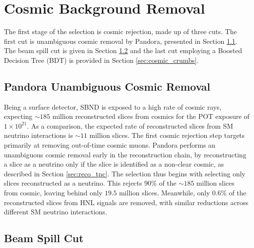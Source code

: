 


\section{Cosmic Background Removal}
\label{sec:cosmic_rej}

The first stage of the selection is cosmic rejection, made up of three cuts.
The first cut is unambiguous cosmic removal by Pandora, presented in Section \ref{sec:cosmic_pandora}.
The beam spill cut is given in Section \ref{sec:cosmic_spill} and the last cut employing a Boosted Decision Tree (BDT) is provided in Section \ref{sec:cosmic_crumbs}.

\subsection{Pandora Unambiguous Cosmic Removal}
\label{sec:cosmic_pandora}

Being a surface detector, SBND is exposed to a high rate of cosmic rays, expecting $\sim 185$ million reconstructed slices from cosmics for the POT exposure of $1 \times 10^{21}$.
As a comparison, the expected rate of reconstructed slices from SM neutrino interactions is $\sim 11$ million slices.
The first cosmic rejection step targets primarily at removing out-of-time cosmic muons.
Pandora performs an unambiguous cosmic removal early in the reconstruction chain, by reconstructing a slice as a neutrino only if the slice is identified as a non-clear cosmic, as described in Section \ref{sec:reco_tpc}. 
The selection thus begins with selecting only slices reconstructed as a neutrino.
This rejects $90 \%$ of the $\sim 185$ million slices from cosmic, leaving behind only $19.5$ million slices.
Meanwhile, only $0.6 \%$ of the reconstructed slices from HNL signals are removed, with similar reductions across different SM neutrino interactions.  


\subsection{Beam Spill Cut}
\label{sec:cosmic_spill}

